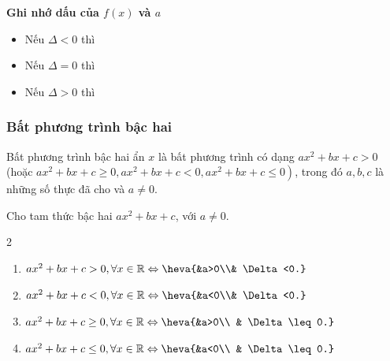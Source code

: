 \begin{boxdn}
	\textbf{Ghi nhớ dấu của $f(x)$ và $a$}
	\begin{itemize}
		\item Nếu $\Delta < 0$ thì\\
		\item Nếu $\Delta = 0$ thì\\
		\item Nếu $\Delta > 0$ thì\\
	\end{itemize}
\end{boxdn}

\subsubsection{Bất phương trình bậc hai}
\begin{dn}
	Bất phương trình bậc hai ẩn $x$ là bất phương trình có dạng $a x^{2}+b x+c>0$ (hoặc $\left.ax^2 + bx + c \geq 0, ax^2 + bx+c<0, a x^{2}+b x+c \leq 0\right)$, trong đó $a, b, c$ là những số thực đã cho và $a \neq 0$.
\end{dn}
\begin{boxdn}
	Cho tam thức bậc hai $ax^2+bx+c$, với $a \ne 0$.
	\begin{multicols}{2}
		\begin{enumerate}
			\item $ax^2+bx+c>0, \forall x\in \mathbb{R} \Leftrightarrow \heva{&a>0\\& \Delta <0.}$
			\item $ax^2+bx+c<0, \forall x \in \mathbb{R} \Leftrightarrow \heva{&a<0\\& \Delta <0.}$
			\item $ax^2+bx+c \geq 0, \forall x\in \mathbb{R} \Leftrightarrow \heva{&a>0\\
				& \Delta \leq 0.}$
			\item $ax^2+bx+c \leq 0, \forall x\in \mathbb{R} \Leftrightarrow \heva{&a<0\\ & \Delta \leq 0.}$
		\end{enumerate}
	\end{multicols}
\end{boxdn}

